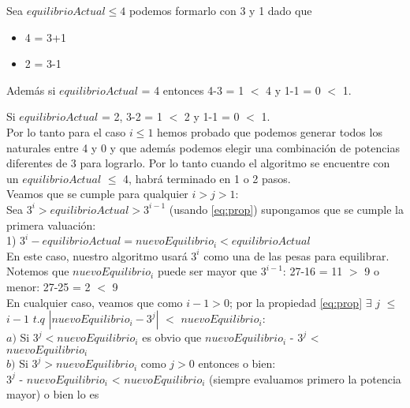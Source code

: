Sea $equilibrioActual \leq 4 $ podemos formarlo con 3 y 1 dado que
\begin{itemize}
\item 4 = 3+1
\item 2 = 3-1
\end{itemize}

Además si $equilibrioActual$ = 4 entonces 4-3 = 1 $<$ 4 y 1-1 = 0 $<$ 1. 

Si $equilibrioActual$ = 2, 3-2 = 1 $<$ 2 y 1-1 = 0 $<$ 1.\\ 

Por lo tanto para el caso $i \leq 1$ hemos probado que podemos generar todos los naturales entre 4 y 0 y que además podemos elegir una combinación de potencias diferentes de 3 para lograrlo. Por lo tanto cuando el algoritmo se encuentre con un $equilibrioActual$ $\leq$ 4, habrá terminado en 1 o 2 pasos.\\ 

Veamos que se cumple para qualquier $i > j > 1$: \\

Sea $3^i > equilibrioActual > 3^{i-1}$ (usando \eqref{eq:prop}) supongamos que se cumple la primera valuación: \\

1) $3^i - equilibrioActual = nuevoEquilibrio_{i} < equilibrioActual$ \\  

En este caso, nuestro algoritmo usará $3^i$ como una de las pesas para equilibrar. \\

Notemos que $nuevoEquilibrio_{i}$ puede ser mayor que $3^{i-1}$: 27-16 = 11 $>$ 9 o menor: 27-25 = 2 $<$ 9 \\

En cualquier caso, veamos que como $i-1 > 0$; por la propiedad \eqref{eq:prop} $\exists$ $j$ $\leq$ $i-1$ $t.q$  $|nuevoEquilibrio_{i} - 3^j|$ $<$ $nuevoEquilibrio_{i}$: \\

$a)$ Si $3^j < nuevoEquilibrio_{i}$ es obvio que $nuevoEquilibrio_{i}$ - $3^j$ < $nuevoEquilibrio_{i}$ \\
 
$b)$ Si $3^j > nuevoEquilibrio_{i}$ como $j > 0$ entonces o bien:\\

$3^j$ - $nuevoEquilibrio_{i}$ < $nuevoEquilibrio_{i}$ (siempre evaluamos primero la potencia mayor) o bien lo es \\  

